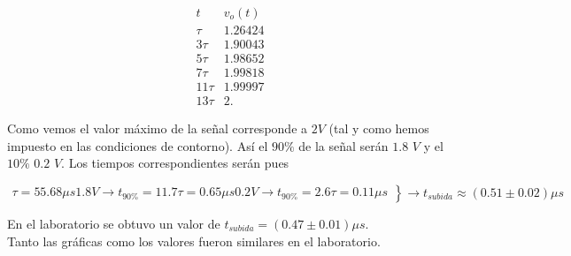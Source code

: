 \documentclass[a4paper,10pt]{article}
\begin{document}
\begin{equation}
\begin{array}{c|c}
 t & v_o(t) \\ \hline
 \tau  & 1.26424 \\
 \text{3$\tau $} & 1.90043 \\
 \text{5$\tau $} & 1.98652 \\
 \text{7$\tau $} & 1.99818 \\
 \text{11$\tau $} & 1.99997 \\
 \text{13$\tau $} & 2.
\end{array}
\end{equation}

Como vemos el valor máximo de la señal corresponde a $2 V$ (tal y como hemos impuesto en las condiciones de contorno).
Así el $90\%$ de la señal serán $1.8$ $V$ y el $10\%$ $0.2$ $V$. Los tiempos correspondientes serán pues 

\begin{equation} \left.
\begin{array}{l}
\tau = 55.68 \mu s
1.8 V \to t_{90\%} =   11.7 \tau = 0.65 \mu s
0.2 V \to t_{90\%} =   2.6 \tau = 0.11 \mu s
\end{array} \right\} \to t_{subida}  \approx (0.51 \pm 0.02) \mu s
\end{equation}

En el laboratorio se obtuvo un valor de $ t_{subida} = (0.47 \pm 0.01) \mu s$. \\

Tanto las gráficas como los valores fueron similares en el laboratorio. 
\end{document}
